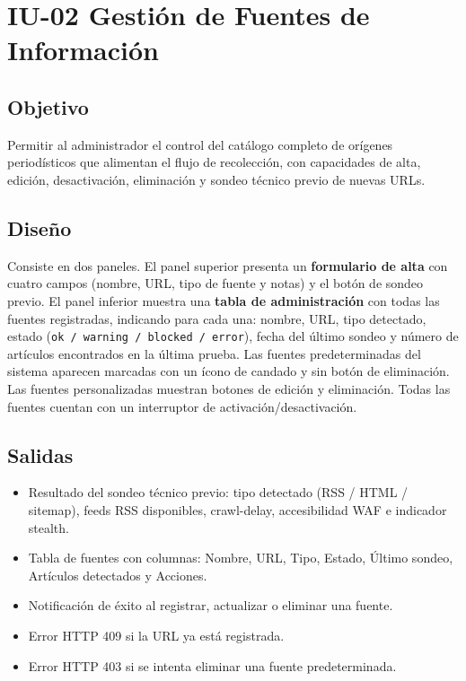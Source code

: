 \section{IU-02 Gestión de Fuentes de Información}

\subsection{Objetivo}
	Permitir al administrador el control del catálogo completo de orígenes periodísticos que alimentan
	el flujo de recolección, con capacidades de alta, edición, desactivación, eliminación y
	sondeo técnico previo de nuevas URLs.

\subsection{Diseño}
	Consiste en dos paneles. El panel superior presenta un \textbf{formulario de alta} con cuatro
	campos (nombre, URL, tipo de fuente y notas) y el botón de sondeo previo. El panel inferior
	muestra una \textbf{tabla de administración} con todas las fuentes registradas, indicando
	para cada una: nombre, URL, tipo detectado, estado (\texttt{ok / warning / blocked / error}),
	fecha del último sondeo y número de artículos encontrados en la última prueba. Las fuentes
	predeterminadas del sistema aparecen marcadas con un ícono de candado y sin botón de
	eliminación. Las fuentes personalizadas muestran botones de edición y eliminación. Todas
	las fuentes cuentan con un interruptor de activación/desactivación.


\subsection{Salidas}
	\begin{itemize}
		\item Resultado del sondeo técnico previo: tipo detectado (RSS / HTML / sitemap),
		      feeds RSS disponibles, crawl-delay, accesibilidad WAF e indicador stealth.
		\item Tabla de fuentes con columnas: Nombre, URL, Tipo, Estado, Último sondeo,
		      Artículos detectados y Acciones.
		\item Notificación de éxito al registrar, actualizar o eliminar una fuente.
		\item Error HTTP 409 si la URL ya está registrada.
		\item Error HTTP 403 si se intenta eliminar una fuente predeterminada.
	\end{itemize}


